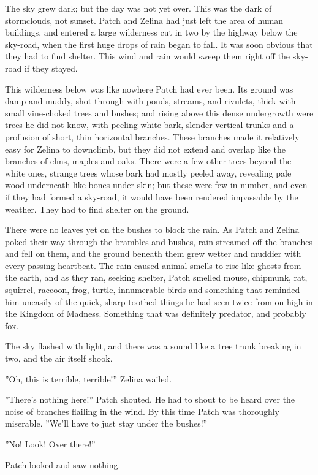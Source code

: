 \documentclass[12pt]{book}
\begin{document}
The sky grew dark; but the day was not yet over. This was the dark of stormclouds, not sunset. Patch and Zelina had just left the area of human buildings, and entered a large wilderness cut in two by the highway below the sky-road, when the first huge drops of rain began to fall. It was soon obvious that they had to find shelter. This wind and rain would sweep them right off the sky-road if they stayed.

This wilderness below was like nowhere Patch had ever been. Its ground was damp and muddy, shot through with ponds, streams, and rivulets, thick with small vine-choked trees and bushes; and rising above this dense undergrowth were trees he did not know, with peeling white bark, slender vertical trunks and a profusion of short, thin horizontal branches. These branches made it relatively easy for Zelina to downclimb, but they did not extend and overlap like the branches of elms, maples and oaks. There were a few other trees beyond the white ones, strange trees whose bark had mostly peeled away, revealing pale wood underneath like bones under skin; but these were few in number, and even if they had formed a sky-road, it would have been rendered impassable by the weather. They had to find shelter on the ground.

There were no leaves yet on the bushes to block the rain. As Patch and Zelina poked their way through the brambles and bushes, rain streamed off the branches and fell on them, and the ground beneath them grew wetter and muddier with every passing heartbeat. The rain caused animal smells to rise like ghosts from the earth, and as they ran, seeking shelter, Patch smelled mouse, chipmunk, rat, squirrel, raccoon, frog, turtle, innumerable birds %
and something that reminded him uneasily of the quick, sharp-toothed things he had seen twice from on high in the Kingdom of Madness. Something that was definitely predator, and probably fox.

The sky flashed with light, and there was a sound like a tree trunk breaking in two, and the air itself shook.

''Oh, this is terrible, terrible!'' Zelina wailed.

''There's nothing here!'' Patch shouted. He had to shout to be heard over the noise of branches flailing in the wind. By this time Patch was thoroughly miserable. ''We'll have to just stay under the bushes!''

''No! Look! Over there!''

Patch looked and saw nothing.
\end{document}
